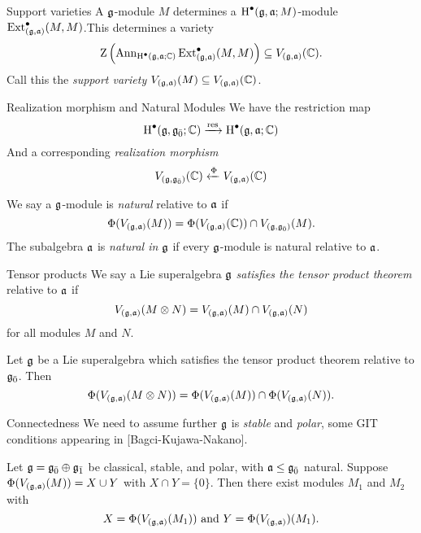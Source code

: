 \documentclass[handout]{beamer}
\begin{document}
\begin{frame}{Support varieties}\pause
  A $\mathfrak{g}$-module $M$ determines a $\operatorname{H}^\bullet(\mathfrak{g},\mathfrak{a};M)$-module $\operatorname{Ext}^\bullet_{(\mathfrak{g},\mathfrak{a})}(M,M)$.\pause This determines a variety
  \[
    \operatorname{Z}\left(\operatorname{Ann}_{\operatorname{H}^\bullet(\mathfrak{g},\mathfrak{a};\mathbb{C})}\operatorname{Ext}^\bullet_{(\mathfrak{g},\mathfrak{a})}(M,M)\right) \subseteq V_{(\mathfrak{g},\mathfrak{a})}(\mathbb{C}).
  \]\pause
  Call this the \emph{support variety} $V_{(\mathfrak{g},\mathfrak{a})}(M) \subseteq V_{(\mathfrak{g},\mathfrak{a})}(\mathbb{C})$.
\end{frame}

\begin{frame}{Realization morphism and Natural Modules}\pause
  We have the restriction map
  \[
    \operatorname{H}^\bullet(\mathfrak{g},{\mathfrak{g}}_{\bar{0}};\mathbb{C}) \xrightarrow{\operatorname{res}} \operatorname{H}^\bullet(\mathfrak{g},\mathfrak{a};\mathbb{C})
  \]\pause
  And a corresponding \emph{realization morphism}
  \[
    V_{(\mathfrak{g},{\mathfrak{g}}_{\bar{0}})}(\mathbb{C}) \xleftarrow{\Phi} V_{(\mathfrak{g},\mathfrak{a})}(\mathbb{C})
  \]
\pause
  \begin{definition}
    We say a $\mathfrak{g}$-module is \emph{natural} relative to $\mathfrak{a}$ if
    \[
      \Phi(V_{(\mathfrak{g},\mathfrak{a})}(M)) = \Phi(V_{(\mathfrak{g},\mathfrak{a})}(\mathbb{C})) \cap V_{(\mathfrak{g},{\mathfrak{g}}_{\bar{0}})}(M).
    \]
    The subalgebra $\mathfrak{a}$ is \emph{natural in $\mathfrak{g}$} if every $\mathfrak{g}$-module is natural relative to $\mathfrak{a}$.
  \end{definition}
  
\end{frame}

\begin{frame}{Tensor products}\pause
  We say a Lie superalgebra $\mathfrak{g}$ \emph{satisfies the tensor product theorem} relative to $\mathfrak{a}$ if
  \[
    V_{(\mathfrak{g},\mathfrak{a})}(M \otimes N) = V_{(\mathfrak{g},\mathfrak{a})}(M) \cap V_{(\mathfrak{g},\mathfrak{a})}(N)
  \]
  for all modules $M$ and $N$.
  \pause
  \begin{theorem}
    Let $\mathfrak{g}$ be a Lie superalgebra which satisfies the tensor product theorem relative to ${\mathfrak{g}}_{\bar{0}}$. Then \[\Phi(V_{(\mathfrak{g},\mathfrak{a})}(M \otimes N)) = \Phi(V_{(\mathfrak{g},\mathfrak{a})}(M)) \cap \Phi(V_{(\mathfrak{g},\mathfrak{a})}(N)).\]
  \end{theorem}
\end{frame}

\begin{frame}{Connectedness} \pause
  We need to assume further $\mathfrak{g}$ is \emph{stable} and \emph{polar}, some GIT conditions appearing in [Bagci-Kujawa-Nakano].

  \pause
  \begin{theorem}
    Let $\mathfrak{g} = {\mathfrak{g}}_{\bar{0}} \oplus {\mathfrak{g}}_{\bar{1}}$ be classical, stable, and polar, with $\mathfrak{a} \leq {\mathfrak{g}}_{\bar{0}}$ natural. Suppose $\Phi(V_{(\mathfrak{g},\mathfrak{a})}(M)) = X \cup Y$ with $X \cap Y = \{0\}$. Then there exist modules $M_1$ and $M_2$ with
    \[
      X = \Phi(V_{(\mathfrak{g},\mathfrak{a})}(M_1)) \text{ and } Y = \Phi(V_{(\mathfrak{g},\mathfrak{a})})(M_1).
    \]
    
  \end{theorem}
\end{frame}
\end{document}

